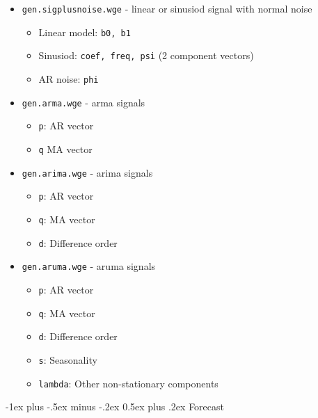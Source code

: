 \documentclass[a4paper]{article}
\makeatletter
\renewcommand{\section}{\@startsection{section}{1}{0mm}%
	{-1ex plus -.5ex minus -.2ex}%
	{0.5ex plus .2ex}%
	{\normalfont\large\bfseries}}
\makeatother
\begin{document}
\begin{multicols}{3}
		\begin{itemize}
			\item \texttt{gen.sigplusnoise.wge} - linear or sinusiod signal with normal noise
			\begin{itemize}
				\item Linear model: \texttt{b0, b1}
				\item Sinusiod: \texttt{coef, freq, psi} (2 component vectors)
				\item AR noise: \texttt{phi}
			\end{itemize}
			\item \texttt{gen.arma.wge} - arma signals
				\begin{itemize}
					\item \texttt{p}: AR vector
					\item \texttt{q} MA vector
				\end{itemize}
			\item \texttt{gen.arima.wge} - arima signals
				\begin{itemize}
					\item \texttt{p}: AR vector
					\item \texttt{q}: MA vector
					\item \texttt{d}: Difference order
				\end{itemize}
			\item \texttt{gen.aruma.wge} - aruma signals
				\begin{itemize}
					\item \texttt{p}: AR vector
					\item \texttt{q}: MA vector
					\item \texttt{d}: Difference order
					\item \texttt{s}: Seasonality
					\item \texttt{lambda}: Other non-stationary components
				\end{itemize}
		\end{itemize}
		
		\section{Forecast}
		

\end{multicols}
\end{document}
